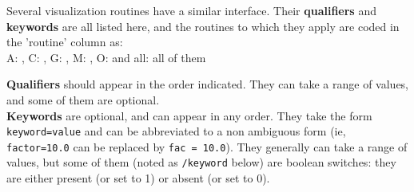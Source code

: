 
Several visualization routines have a similar interface. Their {\bf qualifiers} and
{\bf keywords} are all listed here, and the routines to which they apply are coded
in the 'routine' column as: \\
A: ,
C: ,
G: , 
M: ,
O:  and all: all of them
\vskip 0.4cm

{\bf Qualifiers} should appear in the order indicated. They can take a range of values, and some of them are optional.\\
{\bf Keywords} are optional, and can appear in any order. They take the form {\tt keyword=value} and can be abbreviated to a non ambiguous form
(ie, {\tt factor=10.0} can be replaced by {\tt fac = 10.0}). They generally can take a range of values, but
some of them (noted as {\tt /keyword} below) are boolean switches: they are either present (or set to 1) or absent (or set
to 0).

